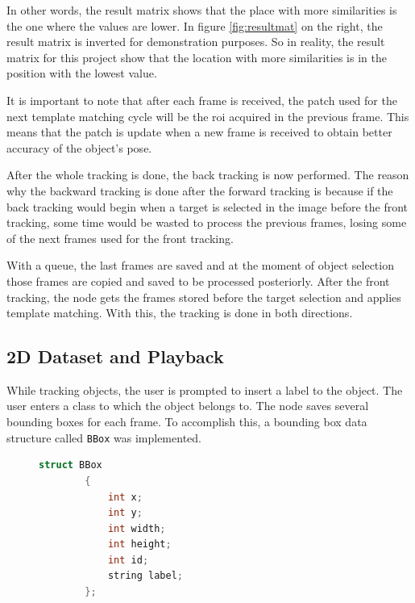 In other words, the result matrix shows that the place with more similarities is the one where the values are lower. In figure \ref{fig:resultmat} on the right, the result matrix is inverted for demonstration purposes. So in reality, the result matrix for this project show that the location with more similarities is in the position with the lowest value.

It is important to note that after each frame is received, the patch used for the next template matching cycle will be the \gls{roi} acquired in the previous frame. This means that the patch is update when a new frame is received to obtain better accuracy of the object's pose. 

After the whole tracking is done, the back tracking is now performed. The reason why the backward tracking is done after the forward tracking is because if the back tracking would begin when a target is selected in the image before the front tracking, some time would be wasted to process the previous frames, losing some of the next frames used for the front tracking. 

With a queue, the last frames are saved and at the moment of object selection those frames are copied and saved to be processed posteriorly. After the front tracking, the node gets the frames stored before the target selection and applies template matching. With this, the tracking is done in both directions.


\subsection{2D Dataset and Playback}

While tracking objects, the user is prompted to insert a label to the object. The user enters a class to which the object belongs to. The node saves several bounding boxes for each frame. To accomplish this, a bounding box data structure called \texttt{BBox} was implemented.

\begin{figure}
	\begin{center}
		\begin{lstlisting}[label={lst:BBox2d}, caption={BBox struct definition used for 2D datasets.},language=c++]
		struct BBox
		{
			int x;
			int y;
			int width;
			int height;
			int id;
			string label;
		};\end{lstlisting}
	\end{center}
\end{figure}


